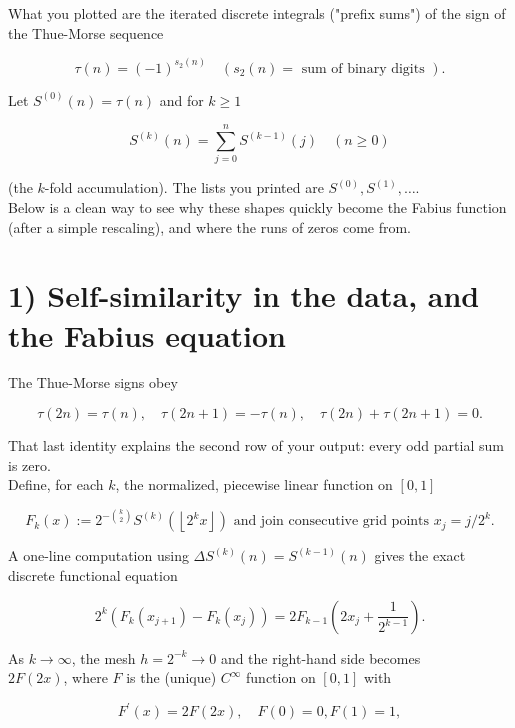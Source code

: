 \documentclass[10pt]{article}
\begin{document}
What you plotted are the iterated discrete integrals ("prefix sums") of the sign of the Thue-Morse sequence

$$
\tau(n)=(-1)^{s_{2}(n)} \quad\left(s_{2}(n)=\text { sum of binary digits }\right) .
$$

Let $S^{(0)}(n)=\tau(n)$ and for $k \geq 1$

$$
S^{(k)}(n)=\sum_{j=0}^{n} S^{(k-1)}(j) \quad(n \geq 0)
$$

(the $k$-fold accumulation). The lists you printed are $S^{(0)}, S^{(1)}, \ldots$.\\
Below is a clean way to see why these shapes quickly become the Fabius function (after a simple rescaling), and where the runs of zeros come from.

\section*{1) Self-similarity in the data, and the Fabius equation}
The Thue-Morse signs obey

$$
\tau(2 n)=\tau(n), \quad \tau(2 n+1)=-\tau(n), \quad \tau(2 n)+\tau(2 n+1)=0 .
$$

That last identity explains the second row of your output: every odd partial sum is zero.\\
Define, for each $k$, the normalized, piecewise linear function on $[0,1]$


\begin{equation*}
F_{k}(x):=2^{-\binom{k}{2}} S^{(k)}\left(\left\lfloor 2^{k} x\right\rfloor\right) \text { and join consecutive grid points } x_{j}=j / 2^{k} . \tag{1}
\end{equation*}


A one-line computation using $\Delta S^{(k)}(n)=S^{(k-1)}(n)$ gives the exact discrete functional equation


\begin{equation*}
2^{k}\left(F_{k}\left(x_{j+1}\right)-F_{k}\left(x_{j}\right)\right)=2 F_{k-1}\left(2 x_{j}+\frac{1}{2^{k-1}}\right) . \tag{2}
\end{equation*}


As $k \rightarrow \infty$, the mesh $h=2^{-k} \rightarrow 0$ and the right-hand side becomes\\
$2 F(2 x)$, where $F$ is the (unique) $C^{\infty}$ function on $[0,1]$ with


\begin{equation*}
F^{\prime}(x)=2 F(2 x), \quad F(0)=0, F(1)=1, \tag{3}
\end{equation*}
\end{document}
